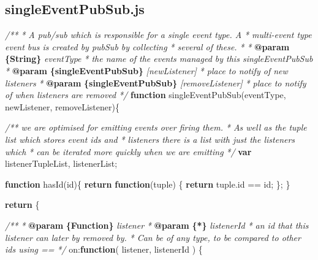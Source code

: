 \documentclass[12pt, ]{article}
\newenvironment{Shaded}{}{}
\newcommand{\KeywordTok}[1]{\textcolor[rgb]{0.00,0.44,0.13}{\textbf{{#1}}}}
\newcommand{\DataTypeTok}[1]{\textcolor[rgb]{0.56,0.13,0.00}{{#1}}}
\newcommand{\CommentTok}[1]{\textcolor[rgb]{0.38,0.63,0.69}{\textit{{#1}}}}
\newcommand{\OtherTok}[1]{\textcolor[rgb]{0.00,0.44,0.13}{{#1}}}
\newcommand{\FunctionTok}[1]{\textcolor[rgb]{0.02,0.16,0.49}{{#1}}}
\newcommand{\NormalTok}[1]{{#1}}
\begin{document}
\pagebreak

\subsection{singleEventPubSub.js}\label{headerux5fsingleEventPubSub}

\label{src_singleEventPubSub}

\begin{Shaded}
\begin{Highlighting}[]
\CommentTok{/** }
\CommentTok{ * A pub/sub which is responsible for a single event type. A }
\CommentTok{ * multi-event type event bus is created by pubSub by collecting}
\CommentTok{ * several of these.}
\CommentTok{ * }
\CommentTok{ * }\KeywordTok{@param}\CommentTok{ }\KeywordTok{\{String\}}\CommentTok{ eventType                   }
\CommentTok{ *    the name of the events managed by this singleEventPubSub}
\CommentTok{ * }\KeywordTok{@param}\CommentTok{ }\KeywordTok{\{singleEventPubSub\}}\CommentTok{ [newListener]    }
\CommentTok{ *    place to notify of new listeners}
\CommentTok{ * }\KeywordTok{@param}\CommentTok{ }\KeywordTok{\{singleEventPubSub\}}\CommentTok{ [removeListener] }
\CommentTok{ *    place to notify of when listeners are removed}
\CommentTok{ */}
\KeywordTok{function} \FunctionTok{singleEventPubSub}\NormalTok{(eventType, newListener, removeListener)\{}

   \CommentTok{/** we are optimised for emitting events over firing them.}
\CommentTok{    *  As well as the tuple list which stores event ids and}
\CommentTok{    *  listeners there is a list with just the listeners which }
\CommentTok{    *  can be iterated more quickly when we are emitting}
\CommentTok{    */}
   \KeywordTok{var} \NormalTok{listenerTupleList,}
       \NormalTok{listenerList;}

   \KeywordTok{function} \FunctionTok{hasId}\NormalTok{(id)\{}
      \KeywordTok{return} \KeywordTok{function}\NormalTok{(tuple) \{}
         \KeywordTok{return} \OtherTok{tuple}\NormalTok{.}\FunctionTok{id} \NormalTok{== id;      }
      \NormalTok{\};  }
   \NormalTok{\}}
              
   \KeywordTok{return} \NormalTok{\{}

      \CommentTok{/**}
\CommentTok{       * }\KeywordTok{@param}\CommentTok{ }\KeywordTok{\{Function\}}\CommentTok{ listener}
\CommentTok{       * }\KeywordTok{@param}\CommentTok{ }\KeywordTok{\{*\}}\CommentTok{ listenerId }
\CommentTok{       *    an id that this listener can later by removed by. }
\CommentTok{       *    Can be of any type, to be compared to other ids using ==}
\CommentTok{       */}
      \DataTypeTok{on}\NormalTok{:}\KeywordTok{function}\NormalTok{( listener, listenerId ) \{}
         

\end{Highlighting}
\end{Shaded}
\end{document}
